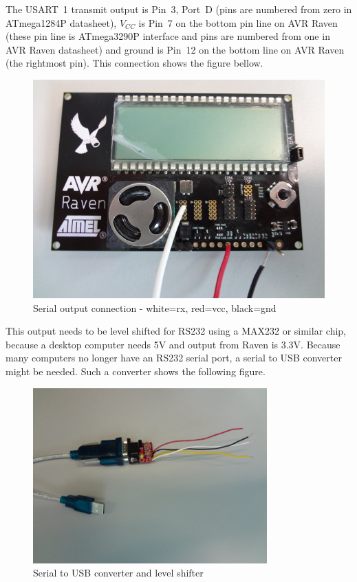 \documentclass{article}
\begin{document}
{{The USART~1 transmit output is Pin~3, Port~D (pins are numbered from zero in ATmega1284P datasheet),
$V_{CC}$ is Pin~7 on the bottom pin line on AVR Raven (these pin line is ATmega3290P interface and
pins are numbered from one in AVR Raven datasheet)
and ground is Pin~12 on the bottom line on AVR Raven (the rightmost pin).
This connection shows the figure bellow.
\begin{figure}[H]
  \centering
  \includegraphics[width=12cm,keepaspectratio]{smallfig/DSC02579-small.jpeg}
  \caption{Serial output connection - white=rx, red=vcc, black=gnd}
\end{figure}

This output needs to be level shifted for RS232 using a MAX232 or similar chip,
because a desktop computer needs 5V and output from Raven is 3.3V.
Because many computers no longer have an RS232 serial port, a serial to USB converter might be needed.
Such a converter shows the following figure.
\begin{figure}[H]
  \centering
  \includegraphics[width=9cm,keepaspectratio]{smallfig/DSC02577-small.jpeg}
  \caption{Serial to USB converter and level shifter}
\end{figure}

}}
\end{document}
